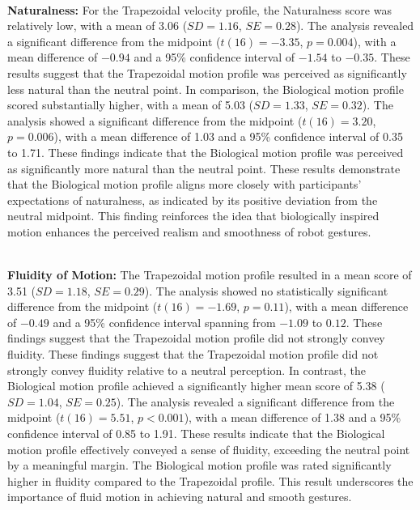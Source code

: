 \documentclass{CSSRforAfrica}
\begin{document}
\vspace{-2mm}
~\\
\noindent \textbf{Naturalness:} 
For the Trapezoidal velocity profile, the Naturalness score was relatively low, with a mean of 3.06 ($SD = 1.16$, $SE = 0.28$). The analysis revealed a significant difference from the midpoint ($t(16) = -3.35$, $p = 0.004$), with a mean difference of $-0.94$ and a 95\% confidence interval of $-1.54$ to $-0.35$. These results suggest that the Trapezoidal motion profile was perceived as significantly less natural than the neutral point.
In comparison, the Biological motion profile scored substantially higher, with a mean of 5.03 ($SD = 1.33$, $SE = 0.32$). The analysis showed a significant difference from the midpoint ($t(16) = 3.20$, $p = 0.006$), with a mean difference of 1.03 and a 95\% confidence interval of 0.35 to 1.71.  These findings indicate that the Biological motion profile was perceived as significantly more natural than the neutral point.
These results demonstrate that the Biological motion profile aligns more closely with participants’ expectations of naturalness, as indicated by its positive deviation from the neutral midpoint. This finding reinforces the idea that biologically inspired motion enhances the perceived realism and smoothness of robot gestures.

\vspace{-2mm}
~\\
\noindent \textbf{Fluidity of Motion:}
The Trapezoidal motion profile resulted in a mean score of 3.51 ($SD = 1.18$, $SE = 0.29$). The analysis showed no statistically significant difference from the midpoint ($t(16) = -1.69$, $p = 0.11$), with a mean difference of $-0.49$ and a 95\% confidence interval spanning from $-1.09$ to $0.12$. These findings suggest that the Trapezoidal motion profile did not strongly convey fluidity.  These findings suggest that the Trapezoidal motion profile did not strongly convey fluidity relative to a neutral perception.
In contrast, the Biological motion profile achieved a significantly higher mean score of 5.38 ($SD = 1.04$, $SE = 0.25$). The analysis revealed a significant difference from the midpoint ($t(16) = 5.51$, $p < 0.001$), with a mean difference of 1.38 and a 95\% confidence interval of 0.85 to 1.91.  These results indicate that the Biological motion profile effectively conveyed a sense of fluidity, exceeding the neutral point by a meaningful margin. 
The Biological motion profile was rated significantly higher in fluidity compared to the Trapezoidal profile. This result underscores the importance of fluid motion in achieving natural and smooth gestures.
\end{document}
